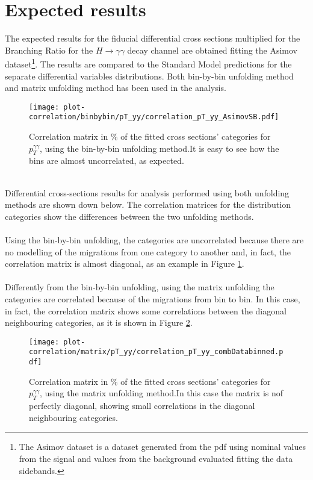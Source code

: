 \section{Expected results}
The expected results for the fiducial differential cross sections multiplied for the Branching Ratio for the $H \rightarrow \gamma\gamma$ decay channel are obtained fitting the Asimov dataset\footnote{The Asimov dataset is a dataset generated from the pdf using nominal values from the signal and values from the background evaluated fitting the data sidebands.}.
The results are compared to the Standard Model predictions for the separate differential variables distributions. Both bin-by-bin unfolding method and matrix unfolding method has been used in the analysis.
\begin{figure}[htb]
\centering
\texttt{[image: plot-correlation/binbybin/pT\_yy/correlation\_pT\_yy\_AsimovSB.pdf]}
\caption{Correlation matrix in \% of the fitted cross sections' categories for $p_T^{\gamma\gamma}$, using the bin-by-bin unfolding method.It is easy to see how the bins are almost uncorrelated, as expected.}
\label{correlation_bin-by-bin_unfolding}
\end{figure}
\\Differential cross-sections results for analysis performed using both unfolding methods are shown down below. The correlation matrices for the distribution categories show the differences between the two unfolding methods.
\\\\
Using the bin-by-bin unfolding, the categories are uncorrelated because there are no modelling of the migrations from one category to another and, in fact, the correlation matrix is almost diagonal, as an example in Figure \ref{correlation_bin-by-bin_unfolding}.
\\\\
Differently from the bin-by-bin unfolding, using the matrix unfolding the categories are correlated because of the migrations from bin to bin. In this case, in fact, the correlation matrix shows some correlations between the diagonal neighbouring categories, as it is shown in Figure \ref{correlation_matrix_unfolding}.
\begin{figure}[t]
\centering
\texttt{[image: plot-correlation/matrix/pT\_yy/correlation\_pT\_yy\_combDatabinned.pdf]}
\caption{Correlation matrix in \% of the fitted cross sections' categories for $p_T^{\gamma\gamma}$, using the matrix unfolding method.In this case the matrix is nof perfectly diagonal, showing small correlations in the diagonal neighbouring categories.}
\label{correlation_matrix_unfolding}
\end{figure}
